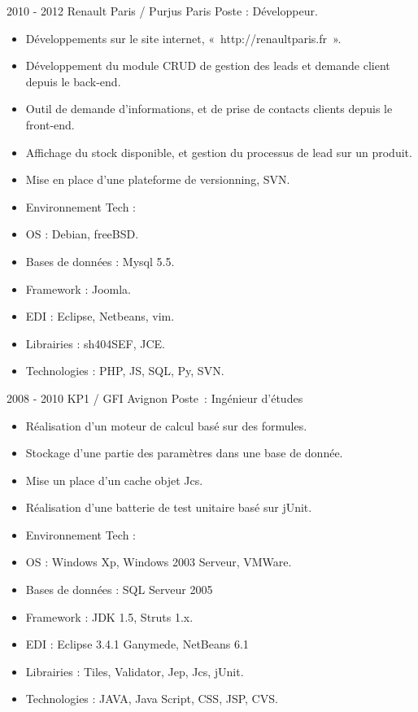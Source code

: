 \documentclass[print]{GuillaumeSeren-cv}
\begin{document}
\begin{entrylist}

  \entryBul
  {2010 - 2012}
  {Renault Paris / Purjus}
  {Paris}
  {Poste : Développeur.}
  {
      \begin{itemize}[leftmargin=*]
          \setlength\itemsep{0pt}
          \item Développements sur le site internet, « http://renaultparis.fr ».
          \item Développement du module CRUD de gestion des leads et demande client depuis le back-end.
          \item Outil de demande d'informations, et de prise de contacts clients depuis le front-end.
          \item Affichage du stock disponible, et gestion du processus de lead sur un produit.
          \item Mise en place d'une plateforme de versionning, SVN.
          \item Environnement Tech :
          \item OS : Debian, freeBSD.
          \item Bases de données : Mysql 5.5.
          \item Framework : Joomla.
          \item EDI : Eclipse, Netbeans, vim.
          \item Librairies : sh404SEF, JCE.
          \item Technologies : PHP, JS, SQL, Py, SVN.
      \end{itemize}
  }

  \entryBul
  {2008 - 2010}
  {KP1 / GFI}
  {Avignon}
  {Poste : Ingénieur d'études}
  {
      \begin{itemize}[leftmargin=*]
          \setlength\itemsep{0pt}
          \item Réalisation d'un moteur de calcul basé sur des formules.
          \item Stockage d'une partie des paramètres dans une base de donnée.
          \item Mise un place d'un cache objet Jcs.
          \item Réalisation d'une batterie de test unitaire basé sur jUnit.
          \item Environnement Tech :
          \item OS : Windows Xp, Windows 2003 Serveur, VMWare.
          \item Bases de données : SQL Serveur 2005
          \item Framework : JDK 1.5,  Struts 1.x.
          \item EDI : Eclipse 3.4.1 Ganymede, NetBeans 6.1
          \item Librairies : Tiles, Validator, Jep, Jcs, jUnit.
          \item Technologies : JAVA, Java Script, CSS, JSP, CVS.
      \end{itemize}
  }


\end{entrylist}
\end{document}
